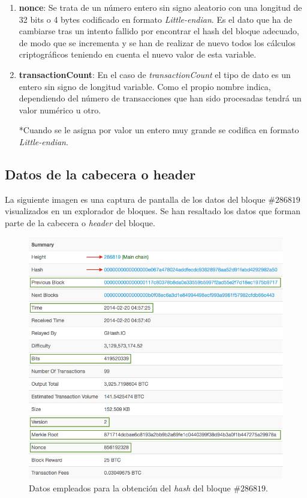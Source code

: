 \documentclass{article}
\begin{document}
\begin{enumerate}
        \item \textbf{nonce}: Se trata de un número entero sin signo aleatorio con una longitud de 32 bits o 4 bytes codificado en formato \textit{Little-endian}. Es el dato que ha de cambiarse tras un intento fallido por encontrar el hash del bloque adecuado, de modo que se incrementa y se han de realizar de nuevo todos los cálculos criptográficos teniendo en cuenta el nuevo valor de esta variable.
        
        \item \textbf{transactionCount}: En el caso de \textit{transactionCount} el tipo de dato es un entero sin signo de longitud variable. Como el propio nombre indica, dependiendo del número de transacciones que han sido procesadas tendrá un valor numérico u otro.
        
        *Cuando se le asigna por valor un entero muy grande se codifica en formato \textit{Little-endian}.
    \end{enumerate}
    
    \subsection{Datos de la cabecera o header}
    La siguiente imagen es una captura de pantalla de los datos del bloque $\#286819$ visualizados en un explorador de bloques. Se han resaltado los datos que forman parte de la cabecera o \textit{header} del bloque.
    \begin{figure}[H]
    \centering
        \includegraphics[scale=0.47]{img/Bitcoin_block_SHA_256_Block_Data}
        \caption{Datos empleados para la obtención del \textit{hash} del bloque \#$286819$.}
    \end{figure}
    
\end{document}
